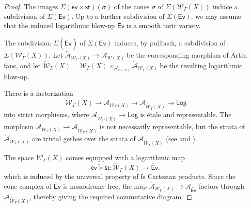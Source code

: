 \documentclass{article}
\def\Ev{{\mathsf{Ev}}}
\def\cW{\mathcal{W}}
\begin{document}
\begin{proof}
    The images $\Sigma(\mathsf{ev} \times \mathsf{st})(\sigma)$ of the cones 
$\sigma$ of $\Sigma(\mathcal{W}_{\Gamma}(X))$ induce a subdivision of 
$\Sigma(\Ev)$. Up to a further subdivision of $\Sigma(\Ev)$, we may assume that the induced logarithmic blow-up $\widetilde{\Ev}$ is a smooth toric variety. 

The subdivision $\Sigma(\widetilde{\Ev})$ of $\Sigma(\Ev)$ induces, by pullback, a subdivision of $\Sigma(\mathcal{W}_{\Gamma}(X))$. Let $\widetilde{\mathcal{A}}_{\cW_\Gamma(X)} \to \mathcal{A}_{\cW(X)}$ be the corresponding morphism of Artin fans, and let $\widetilde{\mathcal{W}}_{\Gamma}(X)= \cW_\Gamma(X) \times_{\mathcal{A}_{\cW(X)}} \widetilde{\mathcal{A}}_{\cW_\Gamma(X)}$ be the resulting logarithmic blow-up.

There is a factorization
\[
\widetilde{\mathcal{W}}_{\Gamma}(X) \longrightarrow \widetilde{\mathcal{A}}_{\cW_\Gamma(X)} \longrightarrow \mathcal{A}_{\widetilde{\mathcal{W}}_{\Gamma}(X)} \to \mathsf{Log}
\]
into strict morphisms, where $\mathcal{A}_{\widetilde{\mathcal{W}}_{\Gamma}(X)} \to \mathsf{Log}$ is étale and representable. The morphism $\widetilde{\mathcal{A}}_{\mathcal{W}_{\Gamma}(X)} \to \mathcal{A}_{\widetilde{\mathcal{W}}_{\Gamma}(X)}$ is not necessarily representable, but the strata of $\widetilde{\mathcal{A}}_{\mathcal{W}_{\Gamma}(X)}$ are trivial gerbes over the strata of $\mathcal{A}_{\widetilde{\mathcal{W}}_{\Gamma}(X)}$ (see \cite[Example 3.3.1]{ACMW} and \cite[Section 4.5]{MPS}).

The space $\widetilde{\mathcal{W}}_{\Gamma}(X)$ comes equipped with a logarithmic map
\[
\widetilde{\mathsf{ev} \times \mathsf{st}} \colon \widetilde{\mathcal{W}}_{\Gamma}(X) \longrightarrow \widetilde{\Ev},
\]
which is induced by the universal property of fs Cartesian products. Since the cone complex of $\widetilde{\Ev}$ is monodromy-free, the map $\widetilde{\mathcal{A}}_{\mathcal{W}_{\Gamma}(X)} \to \mathcal{A}_{\widetilde{\Ev}}$ factors through $\mathcal{A}_{\widetilde{\mathcal{W}}_{\Gamma}(X)}$, thereby giving the required commutative diagram.
\end{proof}
\end{document}
